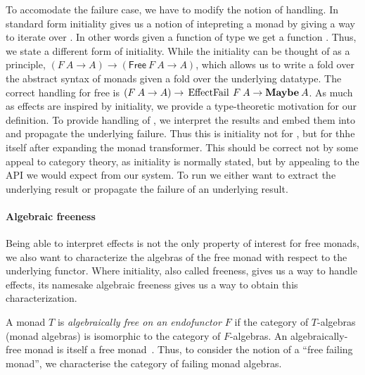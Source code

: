 \documentclass[preprint,sigplan]{acmart}
\begin{document}
To accomodate the failure case,
we have to modify the notion of handling.
In standard form initiality gives us a notion of intepreting a monad  by giving a way to iterate over . 
In other words given a function of type  we get a function .
Thus, we state a different form of initiality. While the initiality can be thought of as a principle,
$ (F\:A \rightarrow A) \rightarrow (\mathsf{Free}\:F\:A \rightarrow A) $, which allows us to write a fold over the abstract syntax of monads given a fold over the underlying datatype.
The correct handling for free  is $ (F\:A \rightarrow A) \rightarrow \text{\haskin{EffectFail}}\:F\:A \rightarrow \text{\haskin{Maybe}}\:A$.
As much as effects are inspired by initiality, we provide a type-theoretic
motivation
for our definition. To provide handling of , we interpret the results and embed them into  and propagate the underlying failure.
Thus this is initiality not for , but for thhe  itself after expanding the  monad transformer.
This should be correct not by some appeal to category theory, as initiality is normally stated, but by appealing to the API we would expect from our system.
To run  we either want to extract the underlying
result or propagate the failure of an underlying  result.

\paragraph{Algebraic freeness}

Being able to interpret effects is not the only property of interest for free monads, we also want to characterize the algebras of the free monad with respect to the underlying functor.
Where initiality, also called freeness, gives us a way to handle effects, its namesake algebraic freeness gives us a way to obtain this characterization.

A monad $T$ is \emph{algebraically free on an endofunctor $F$} if
the category of $T$-algebras (monad algebras) is isomorphic to the category of
$F$-algebras. An algebraically-free monad is itself a free monad~\cite{nlab:free_monad,kelly_1980}.
Thus, to consider the notion of a ``free failing
monad'', we characterise the category of failing monad algebras.

\end{document}
